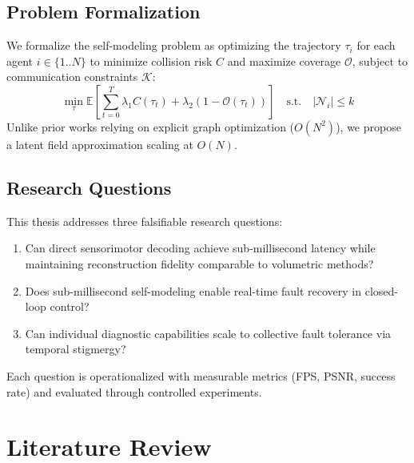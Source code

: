 \documentclass[12pt,a4paper,oneside]{report}
\begin{document}
\section{Problem Formalization}
We formalize the self-modeling problem as optimizing the trajectory $\tau_i$ for each agent $i \in \{1..N\}$ to minimize collision risk $C$ and maximize coverage $\mathcal{O}$, subject to communication constraints $\mathcal{K}$:
\begin{equation}
    \min_{\tau} \mathbb{E} \left[ \sum_{t=0}^{T} \lambda_1 C(\tau_t) + \lambda_2 (1 - \mathcal{O}(\tau_t)) \right] \quad \text{s.t.} \quad |\mathcal{N}_i| \leq k
    \label{eq:optimization}
\end{equation}
Unlike prior works relying on explicit graph optimization ($O(N^2)$), we propose a latent field approximation scaling at $O(N)$.

\section{Research Questions}
This thesis addresses three falsifiable research questions:
\begin{enumerate}
    \item[\textbf{RQ1:}] Can direct sensorimotor decoding achieve sub-millisecond latency while maintaining reconstruction fidelity comparable to volumetric methods?
    \item[\textbf{RQ2:}] Does sub-millisecond self-modeling enable real-time fault recovery in closed-loop control?
    \item[\textbf{RQ3:}] Can individual diagnostic capabilities scale to collective fault tolerance via temporal stigmergy?
\end{enumerate}
Each question is operationalized with measurable metrics (FPS, PSNR, success rate) and evaluated through controlled experiments.

\chapter{Literature Review}
\label{chap:literature}


\end{document}
